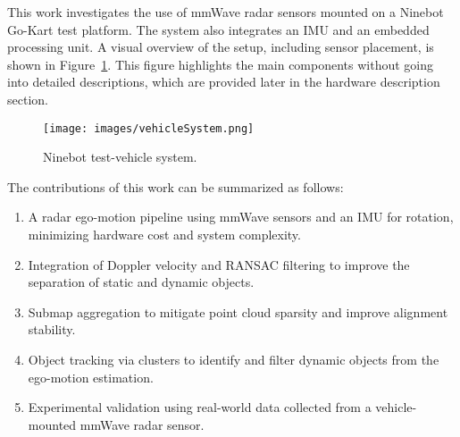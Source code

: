 This work investigates the use of mmWave radar sensors mounted on a Ninebot Go-Kart test platform.  
The system also integrates an IMU and an embedded processing unit.  
A visual overview of the setup, including sensor placement, is shown in Figure~\ref{fig:Ninebot_system}.  
This figure highlights the main components without going into detailed descriptions, which are provided later in the hardware description section.  

\begin{figure}[!htbp]
    \centering
    \texttt{[image: images/vehicleSystem.png]}
    \caption{Ninebot test-vehicle system.}
    \label{fig:Ninebot_system}
\end{figure}

\newpage
The contributions of this work can be summarized as follows:  
\begin{enumerate}
    \item A radar ego-motion pipeline using mmWave sensors and an IMU for rotation, minimizing hardware cost and system complexity.
    \item Integration of Doppler velocity and RANSAC filtering to improve the separation of static and dynamic objects.
    \item Submap aggregation to mitigate point cloud sparsity and improve alignment stability.
    \item Object tracking via clusters to identify and filter dynamic objects from the ego-motion estimation.
    \item Experimental validation using real-world data collected from a vehicle-mounted mmWave radar sensor.  
\end{enumerate}
